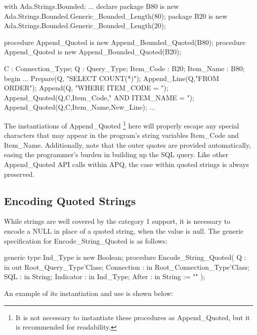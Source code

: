 \documentclass[english,letterpaper]{book}
\begin{document}
\begin{Example}
with Ada.Strings.Bounded;
...
declare
   package B80 
      is new Ada.Strings.Bounded.Generic_Bounded_Length(80);
   package B20 
      is new Ada.Strings.Bounded.Generic_Bounded_Length(20);

   procedure Append_Quoted is new Append_Bounded_Quoted(B80);
   procedure Append_Quoted is new Append_Bounded_Quoted(B20);

   C :         Connection_Type;
   Q :         Query_Type;
   Item_Code : B20;
   Item_Name : B80;
begin
   ...
   Prepare(Q,    "SELECT COUNT(*)");
   Append_Line(Q,"FROM ORDER");
   Append(Q,     "WHERE ITEM_CODE = ");
   Append_Quoted(Q,C,Item_Code," AND ITEM_NAME = ");
   Append_Quoted(Q,C,Item_Name,New_Line);
   ...
\end{Example}

The instantiations of Append\_Quoted%
\footnote{It is not necessary to instantiate these procedures as
Append\_Quoted, but it is recommended for readability.} here will
properly escape any special characters that may appear in the program's
string variables Item\_Code and Item\_Name. Additionally, note that the
outer quotes are provided automatically, easing the programmer's burden
in building up the SQL query. Like other Append\_Quoted API calls within
APQ, the case within quoted strings is always preserved.


\subsection{Encoding Quoted Strings}

While strings are well covered by the category 1 support, it is necessary
to encode a NULL in place of a quoted string,
when the value is null. The generic specification for 
Encode\-\_String\-\_Quoted is as follows:

\begin{Code}
generic
   type Ind_Type is new Boolean;
procedure Encode_String_Quoted(
   Q :          in out Root_Query_Type'Class;
   Connection : in     Root_Connection_Type'Class;
   SQL :        in     String;
   Indicator :  in     Ind_Type;
   After :      in     String := ""
);
\end{Code}

An example of its instantiation and use is shown below:
\end{document}
